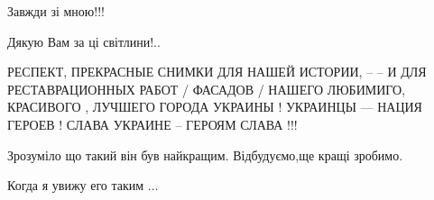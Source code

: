 \begin{itemize}
Завжди зі мною!!!

Дякую Вам за ці світлини!..


\obeycr
РЕСПЕКТ, ПРЕКРАСНЫЕ СНИМКИ ДЛЯ НАШЕЙ ИСТОРИИ, -- -- И ДЛЯ РЕСТАВРАЦИОННЫХ РАБОТ / ФАСАДОВ /
НАШЕГО ЛЮБИМИГО, КРАСИВОГО , ЛУЧШЕГО ГОРОДА УКРАИНЫ !
УКРАИНЦЫ --- НАЦИЯ ГЕРОЕВ !
СЛАВА УКРАИНЕ -- ГЕРОЯМ СЛАВА !!!
\restorecr

Зрозуміло що такий він був найкращим. Відбудуємо,ще кращі зробимо.

Когда я увижу его таким ...

\end{itemize} %
